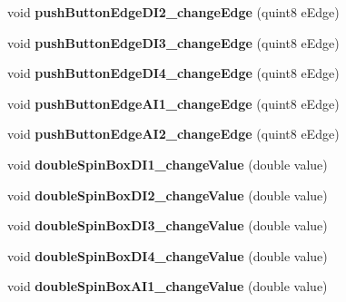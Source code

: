 \begin{DoxyCompactItemize}
\item 
\mbox{\label{class_setting_window_a0831617c3eb2f461f5b0ccacf65209ba}} 
void {\bfseries push\+Button\+Edge\+D\+I2\+\_\+change\+Edge} (quint8 e\+Edge)
\item 
\mbox{\label{class_setting_window_aca242dd915f587ed4e04e69d17c642cc}} 
void {\bfseries push\+Button\+Edge\+D\+I3\+\_\+change\+Edge} (quint8 e\+Edge)
\item 
\mbox{\label{class_setting_window_ac927f6f56ae76f722f97208066e097ed}} 
void {\bfseries push\+Button\+Edge\+D\+I4\+\_\+change\+Edge} (quint8 e\+Edge)
\item 
\mbox{\label{class_setting_window_a4d60b83b361944110828330786478d33}} 
void {\bfseries push\+Button\+Edge\+A\+I1\+\_\+change\+Edge} (quint8 e\+Edge)
\item 
\mbox{\label{class_setting_window_a274227a0a2cbe687e8365d6118c932da}} 
void {\bfseries push\+Button\+Edge\+A\+I2\+\_\+change\+Edge} (quint8 e\+Edge)
\item 
\mbox{\label{class_setting_window_abebef1469b9145c21b9a9dacd67fc12e}} 
void {\bfseries double\+Spin\+Box\+D\+I1\+\_\+change\+Value} (double value)
\item 
\mbox{\label{class_setting_window_a56c6e4e2af7b334d8ff1f544182d9038}} 
void {\bfseries double\+Spin\+Box\+D\+I2\+\_\+change\+Value} (double value)
\item 
\mbox{\label{class_setting_window_a64e3bd9b119976baa6a30d5e8e3fbd7e}} 
void {\bfseries double\+Spin\+Box\+D\+I3\+\_\+change\+Value} (double value)
\item 
\mbox{\label{class_setting_window_ad868d448422c9eb2a0490b2a7c845062}} 
void {\bfseries double\+Spin\+Box\+D\+I4\+\_\+change\+Value} (double value)
\item 
\mbox{\label{class_setting_window_a5d2d6cd6b56a8ff46ae2bfd1de4975d2}} 
void {\bfseries double\+Spin\+Box\+A\+I1\+\_\+change\+Value} (double value)

\end{DoxyCompactItemize}
